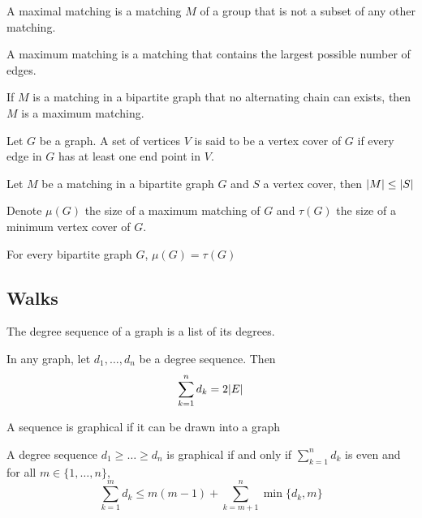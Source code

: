 \documentclass[a4paper]{article}
\begin{document}
\begin{defn} A maximal matching is a matching $M$ of a group that is not a subset of any other matching. 
\end{defn}

\begin{defn} A maximum matching is a matching that contains the largest possible number of edges. 
\end{defn}

\begin{thm} If $M$ is a matching in a bipartite graph that no alternating chain can exists, then $M$ is a maximum matching. 
\end{thm}

\begin{defn} Let $G$ be a graph. A set of vertices $V$ is said to be a vertex cover of $G$ if every edge in $G$ has at least one end point in $V$. 
\end{defn}

\begin{prp} Let $M$ be a matching in a bipartite graph $G$ and $S$ a vertex cover, then $\abs{M}\leq\abs{S}$
\end{prp}

\begin{defn} Denote $\mu(G)$ the size of a maximum matching of $G$ and $\tau(G)$ the size of a minimum vertex cover of $G$. 
\end{defn}

\begin{thm} For every bipartite graph $G$, $\mu(G)=\tau(G)$
\end{thm}

\subsection{Walks}
\begin{defn} The degree sequence of a graph is a list of its degrees. 
\end{defn}

\begin{thm} In any graph, let $d_1,\dots,d_n$ be a degree sequence. Then $$\sum_{k=1}^nd_k=2\abs{E}$$
\end{thm}

\begin{defn} A sequence is graphical if it can be drawn into a graph
\end{defn}

\begin{thm} A degree sequence $d_1\geq\dots\geq d_n$ is graphical if and only if $\sum_{k=1}^nd_k$ is even and for all $m\in\{1,\dots,n\}$, $$\sum_{k=1}^md_k\leq m(m-1)+\sum_{k=m+1}^n\min\{d_k,m\}$$
\end{thm}
\end{document}
